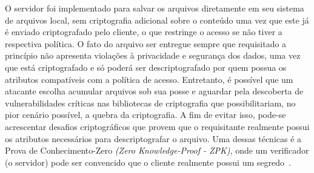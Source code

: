 \documentclass[a4paper,11pt]{article}
\begin{document}

O servidor foi implementado para salvar os arquivos diretamente em seu sistema de arquivos local, sem criptografia adicional sobre o conteúdo uma vez que este já é enviado criptografado pelo cliente, o que restringe o acesso se não tiver a respectiva política.
O fato do arquivo ser entregue sempre que requisitado a princípio não apresenta violações à privacidade e segurança dos dados, uma vez que está criptografado e só poderá ser descriptografado por quem possua os atributos compatíveis com a política de acesso.
Entretanto, é possível que um atacante escolha acumular arquivos sob sua posse e aguardar pela descoberta de vulnerabilidades críticas nas bibliotecas de criptografia que possibilitariam, no pior cenário possível, a quebra da criptografia.
A fim de evitar isso, pode-se acrescentar desafios criptográficos que provem que o requisitante realmente possui os atributos necessários para descriptografar o arquivo.
Uma dessas técnicas é a Prova de Conhecimento-Zero \emph{(Zero Knowledge-Proof - ZPK)}, onde um verificador (o servidor) pode ser convencido que o cliente realmente possui um segredo~\cite{Rice2010,Buchanan2017}.

\end{document}
